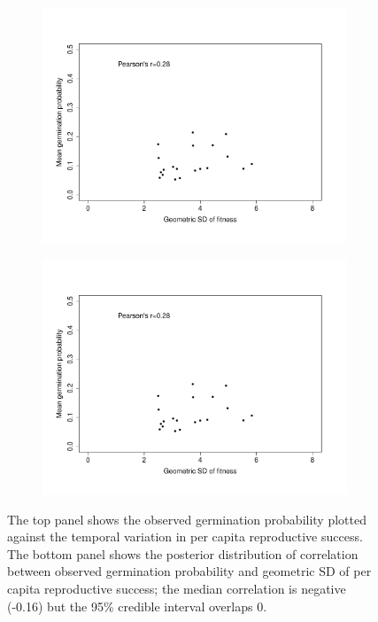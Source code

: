 \documentclass[12pt, oneside, titlepage]{article}   	%
\begin{document}
\begin{figure}
\centering
\begin{subfigure}[h]{.65\textwidth}
\centering
       \includegraphics[page=1,width=1\textwidth]{../figures/germ_rs_correlation.pdf}  
\end{subfigure}

\begin{subfigure}[h]{.9\textwidth}
\centering
       \includegraphics[page=2,width=1\textwidth]{../figures/germ_rs_correlation.pdf}  
\end{subfigure}

 \caption{ The top panel shows the observed germination probability plotted against the temporal variation in per capita reproductive success. The bottom panel shows the posterior distribution of correlation between observed germination probability and geometric SD of per capita reproductive success; the median correlation is negative (-0.16) but the 95\% credible interval overlaps 0. }
 
 \end{figure}
\end{document}
